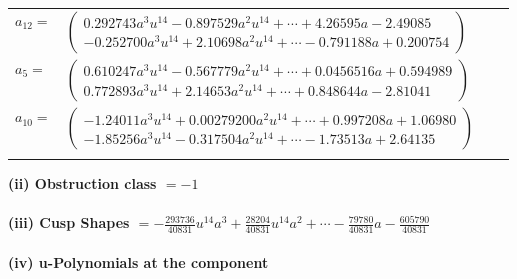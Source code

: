 \documentclass[1p]{elsarticle_modified}
\theoremstyle{definition}
\begin{document}
\begin{tabular}{m{7pt} m{180pt} m{7pt} m{180pt} }
\flushright $a_{12}=$&$\begin{pmatrix}0.292743 a^{3} u^{14}-0.897529 a^{2} u^{14}+\cdots+4.26595 a-2.49085\\-0.252700 a^{3} u^{14}+2.10698 a^{2} u^{14}+\cdots-0.791188 a+0.200754\end{pmatrix}$ \\
\flushright $a_{5}=$&$\begin{pmatrix}0.610247 a^{3} u^{14}-0.567779 a^{2} u^{14}+\cdots+0.0456516 a+0.594989\\0.772893 a^{3} u^{14}+2.14653 a^{2} u^{14}+\cdots+0.848644 a-2.81041\end{pmatrix}$ \\
\flushright $a_{10}=$&$\begin{pmatrix}-1.24011 a^{3} u^{14}+0.00279200 a^{2} u^{14}+\cdots+0.997208 a+1.06980\\-1.85256 a^{3} u^{14}-0.317504 a^{2} u^{14}+\cdots-1.73513 a+2.64135\end{pmatrix}$\\&\end{tabular}
\flushleft \textbf{(ii) Obstruction class $= -1$}\\~\\
\flushleft \textbf{(iii) Cusp Shapes $= -\frac{293736}{40831} u^{14} a^3+\frac{28204}{40831} u^{14} a^2+\cdots-\frac{79780}{40831} a-\frac{605790}{40831}$}\\~\\
\newpage\renewcommand{\arraystretch}{1}
\flushleft \textbf{(iv) u-Polynomials at the component}\newline \\
\end{document}
